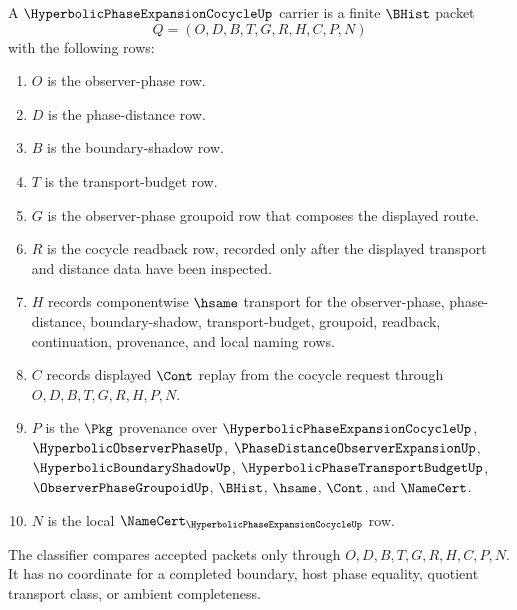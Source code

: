 \begin{definition}
\label{def:hyperbolic-phase-expansion-cocycle-carrier}
A $\HyperbolicPhaseExpansionCocycleUp$ carrier is a finite $\BHist$ packet
$$
Q=(O,D,B,T,G,R,H,C,P,N)
$$
with the following rows:
\begin{enumerate}
\item $O$ is the observer-phase row.
\item $D$ is the phase-distance row.
\item $B$ is the boundary-shadow row.
\item $T$ is the transport-budget row.
\item $G$ is the observer-phase groupoid row that composes the displayed route.
\item $R$ is the cocycle readback row, recorded only after the displayed transport and distance data have been inspected.
\item $H$ records componentwise $\hsame$ transport for the observer-phase, phase-distance, boundary-shadow, transport-budget, groupoid, readback, continuation, provenance, and local naming rows.
\item $C$ records displayed $\Cont$ replay from the cocycle request through $O,D,B,T,G,R,H,P,N$.
\item $P$ is the $\Pkg$ provenance over $\HyperbolicPhaseExpansionCocycleUp$, $\HyperbolicObserverPhaseUp$, $\PhaseDistanceObserverExpansionUp$, $\HyperbolicBoundaryShadowUp$, $\HyperbolicPhaseTransportBudgetUp$, $\ObserverPhaseGroupoidUp$, $\BHist$, $\hsame$, $\Cont$, and $\NameCert$.
\item $N$ is the local $\NameCert_{\HyperbolicPhaseExpansionCocycleUp}$ row.
\end{enumerate}
The classifier compares accepted packets only through $O,D,B,T,G,R,H,C,P,N$. It has no coordinate for a completed boundary, host phase equality, quotient transport class, or ambient completeness.
\end{definition}

